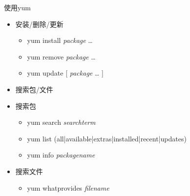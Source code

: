 \begin{frame}{使用yum}
\begin{itemize}
\item 安装/删除/更新

\begin{itemize}
\item yum install \emph{package} \ldots{}
\item yum remove \emph{package} \ldots{}
\item yum update {[} \emph{package} \ldots{} {]}
\end{itemize}
\item 搜索包/文件
\item 搜索包

\begin{itemize}
\item yum search \emph{searchterm}
\item yum list (all|available|extras|installed|recent|updates)
\item yum info \emph{packagename}
\end{itemize}
\item 搜索文件

\begin{itemize}
\item yum whatprovides \emph{filename}
\end{itemize}
\end{itemize}
\end{frame} 

%
%
%

